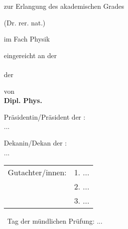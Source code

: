 \makeatletter
\begin{titlepage}
\begin{spacing}{1}
  \setlength{\parindentbak}{\parindent}
  \setlength{\parskipbak}{\parskip}

\setlength{\parindent}{0pt}
\setlength{\parskip}{\baselineskip}

\thispagestyle{empty}

\expandafter \Large\sffamily \expandafter

\begin{center}
\begin{spacing}{1.2}
\begingroup
\fontsize{18pt}{10pt}\selectfont
{\textbf{\mytitle}}
\endgroup
\end{spacing}

\vfill


zur Erlangung des akademischen Grades


(Dr. rer. nat.)

im Fach Physik

eingereicht an der \\ \myfaculty \\ der \myuni 

von\\

\textbf{Dipl. Phys. \myname} \\

\vfill
\vfill

Pr\"asidentin/Pr\"asident der \myuni: \\
\vspace{0.2\baselineskip}
...  \\
\vspace{\baselineskip}

Dekanin/Dekan der \myfaculty: \\
\vspace{0.2\baselineskip}
...  \\
\vspace{1.5\baselineskip}

\end{center}
\noindent
\begin{tabular}{ll}
Gutachter/innen: 
& 1. ... \\
& 2. ... \\
& 3. ... \\
\end{tabular}

~Tag der m\"undlichen Pr\"ufung: ...

\setlength{\parindent}{\parindentbak}
\setlength{\parskip}{\parskipbak}
\end{spacing}
\end{titlepage}
\makeatother

